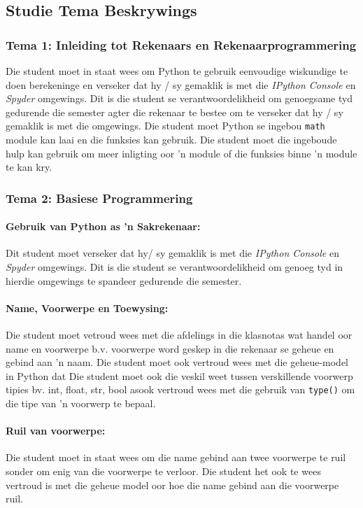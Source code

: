     \subsection{Studie Tema Beskrywings}
        \subsubsection{Tema 1: Inleiding tot Rekenaars en Rekenaarprogrammering}

	Die student moet in staat wees om Python te gebruik eenvoudige wiskundige te doen 
             berekeninge en verseker dat hy / sy gemaklik is met 
             die \emph{IPython Console} en \emph {Spyder} omgewings. Dit is die student se verantwoordelikheid om genoegsame tyd gedurende die semester agter die rekenaar te bestee om te verseker dat hy / sy gemaklik is
	met die omgewings. Die student moet Python se ingebou \texttt{math} module kan laai
            en die funksies kan gebruik. Die student moet die ingeboude hulp kan gebruik om meer inligting oor 
	'n module of die funksies binne 'n module te kan kry.
            
        \subsubsection{Tema 2: Basiese Programmering}
            \paragraph{Gebruik van Python as 'n Sakrekenaar:}
		 Dit student moet verseker dat hy/ sy gemaklik is met die 
		 \emph{IPython Console} en \emph{Spyder} omgewings.  Dit is die 
		 student se verantwoordelikheid om genoeg tyd in hierdie omgewings
		 te spandeer gedurende die semester.
       
	     \paragraph{Name, Voorwerpe en Toewysing:}
		 Die student moet vetroud wees met die afdelings in die klasnotas wat handel oor
		 name en voorwerpe b.v. voorwerpe word geskep in die rekenaar se geheue en 
		 gebind aan 'n naam.  Die student moet ook vertroud wees met die 
		 geheue-model in Python dat 
		 Die student moet ook die veskil weet
		 tussen verskillende voorwerp tipies bv. int, float, str, bool asook vertroud wees met 
		die gebruik van \texttt{type()} om die tipe van 'n voorwerp te bepaal.

	\paragraph{Ruil van voorwerpe:}
		Die student moet in staat wees om die name gebind aan twee voorwerpe te ruil sonder 
             	om enig van die voorwerpe te verloor. Die student het ook te wees 
            	 vertroud is met die geheue model oor hoe die name gebind
	          aan die voorwerpe ruil.
	
